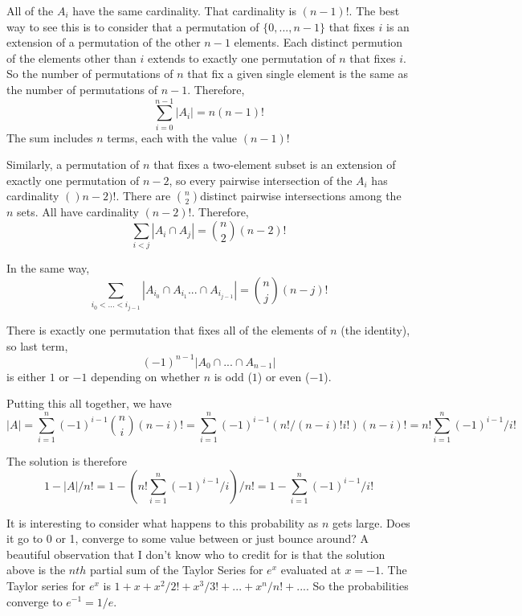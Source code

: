 \documentclass[11pt,a4paper]{report}
\theoremstyle{plain}
\theoremstyle{definition}
\theoremstyle{remark}
\begin{document}
All of the $A_i$ have the same cardinality.  That cardinality is $(n-1)!$.  The best way to see this is to consider that a permutation of $\{0, ...,  n - 1\}$ that fixes $i$ is an extension of a permutation of the other $n - 1$ elements.  Each distinct permution of the elements other than $i$ extends to exactly one permutation of $n$ that fixes $i$.  So the number of permutations of $n$ that fix a given single element is the same as the number of permutations of $n - 1$.
Therefore,
$$\sum_{i=0}^{n-1} |A_{i}| = n(n-1)!$$
The sum includes $n$ terms, each with the value $(n - 1)!$

Similarly, a permutation of $n$ that fixes a two-element subset is an extension of exactly one permutation of $n-2$, so every pairwise intersection of the $A_i$ has cardinality $()n - 2)!$.  There are $\binom{n}{2} $distinct pairwise intersections among the $n$ sets.  All have cardinality $(n - 2)!$.  Therefore,
$$ \sum_{i < j} {|A_i \cap A_j|}  = \binom{n}{2} {(n - 2)}!$$

In the same way, 
$$\sum_{ i_0 < ...<i_{j-1}}{ |A_{i_0} \cap A_{i_1} ... \cap A_{i_{j-1}}|} = \binom{n}{j}(n - j)!$$

There is exactly one permutation that fixes all of the elements of $n$ (the identity), so last term, 
$$(-1)^{n-1}|A_{0} \cap ... \cap A_{n-1}|$$ 
is either $1$ or $-1$ depending on whether $n$ is odd ($1$) or  even ($-1$).

Putting this all together,  we have $$|A| = \sum_{i=1}^{n}(-1)^{i-1}\binom{n}{i}(n - i)! =  \sum_{i=1}^{n}(-1)^{i-1}(n!/(n - i)!i!)(n - i)!  = n!  \sum_{i=1}^{n}(-1)^{i-1}/i!$$ 

The solution is therefore $$1 - |A|/n! = 1 - (n!  \sum_{i=1}^{n}(-1)^{i-1}/i)/n! = 1 - \sum_{i=1}^{n}(-1)^{i-1}/i! $$

It is interesting to consider what happens to this probability as $n$ gets large.  Does it go to 0 or 1, converge to some value between or just bounce around?  A beautiful observation that I don't know who to credit for is that the solution above is the $nth$ partial sum of the Taylor Series for $e^x$ evaluated at $x=-1$.  The Taylor series for $e^x$ is $1 + x + x^2 / 2! + x^3 / 3! + ... + x^n/n! + ...$.  So the probabilities converge to $e^{-1} = 1/e.$
\end{document}
